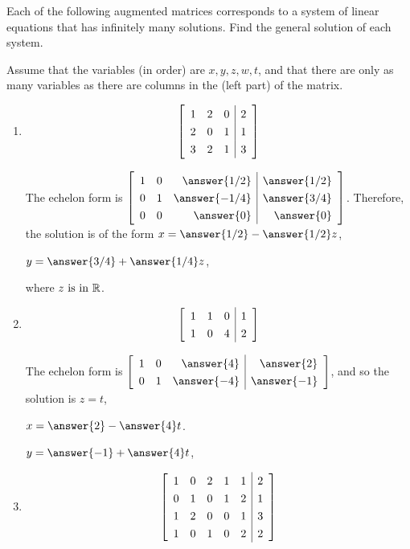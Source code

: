 \documentclass{ximera}
\author{Zack Reed}
\begin{document}
\begin{exercise}

    Each of the following augmented matrices corresponds to a system of linear equations that has infinitely many solutions. Find the general solution of each system.

    Assume that the variables (in order) are $x, y, z, w, t$, and that there are only as many variables as there are columns in the (left part) of the matrix.

    \begin{enumerate}

        \item 
        \begin{equation*}    
            \startmat{rrr|r}
              1 & 2 & 0 & 2 \\
              2 & 0 & 1 & 1 \\
              3 & 2 & 1 & 3
            \stopmat
        \end{equation*}

        The echelon form is
        $\def\arraystretch{1.3}
        \startmat{rrr|r}
          1 & 0 & \answer{1/2} & \answer{1/2} \\
          0 & 1 & \answer{-1/4} & \answer{3/4} \\
          0 & 0 & \answer{0} & \answer{0}
        \stopmat$. Therefore, the solution is of the form $x=\answer{1/2}-\answer{1/2}z$, 
        
        $y=\answer{3/4}+\answer{1/4}z$, 
        
        where $z\text{ is in } \mathbb{R}$.

        \item 
        \begin{equation*}
            \startmat{rrr|r}
              1 & 1 & 0 & 1 \\
              1 & 0 & 4 & 2
            \stopmat
        \end{equation*}

        The echelon form is 
        $\startmat{rrr|r}
          1 & 0 & \answer{4} & \answer{2} \\
          0 & 1 & \answer{-4} & \answer{-1}
        \stopmat$, and so the solution is $z=t$, 
        
        $x=\answer{2}-\answer{4}t$.
        
        $y=\answer{-1}+\answer{4}t$, 
        
        


        \item 
        \begin{equation*}
            \startmat{rrrrr|r}
              1 & 0 & 2 & 1 & 1 & 2 \\
              0 & 1 & 0 & 1 & 2 & 1 \\
              1 & 2 & 0 & 0 & 1 & 3 \\
              1 & 0 & 1 & 0 & 2 & 2
            \stopmat
        \end{equation*}


\end{enumerate}
\end{exercise}
\end{document}
